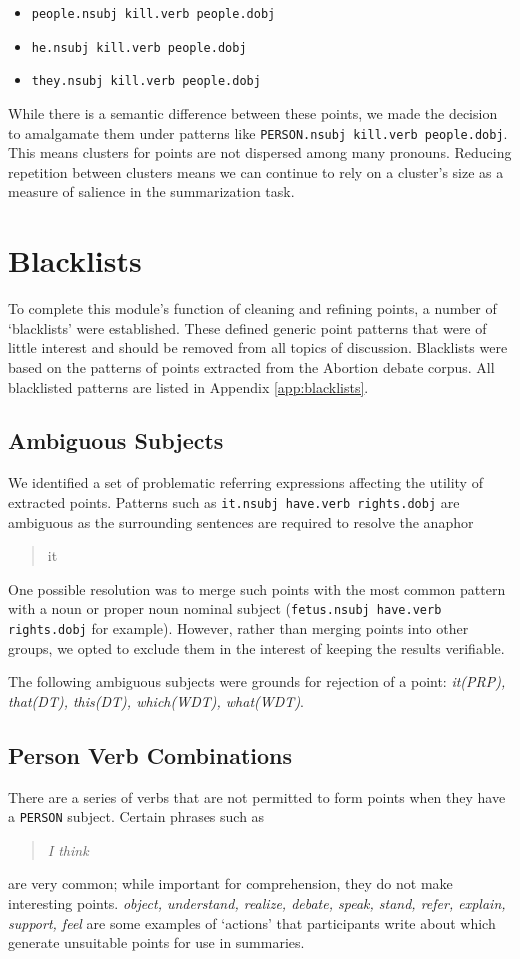     \begin{itemize}
      \item{\texttt{people.nsubj kill.verb people.dobj}}
      \item{\texttt{he.nsubj kill.verb people.dobj}}
      \item{\texttt{they.nsubj kill.verb people.dobj}}
    \end{itemize}

    While there is a semantic difference between these points, we made the decision to amalgamate them under patterns like \texttt{PERSON.nsubj kill.verb people.dobj}. This means clusters for points are not dispersed among many pronouns. Reducing repetition between clusters means we can continue to rely on a cluster's size as a measure of salience in the summarization task.

  \section{Blacklists}
    To complete this module's function of cleaning and refining points, a number of `blacklists' were established. These defined generic point patterns that were of little interest and should be removed from all topics of discussion. Blacklists were based on the patterns of points extracted from the Abortion debate corpus. All blacklisted patterns are listed in Appendix \ref{app:blacklists}.

    \tocless\subsection{Ambiguous Subjects}
      We identified a set of problematic referring expressions affecting the utility of extracted points. Patterns such as \texttt{it.nsubj have.verb rights.dobj} are ambiguous as the surrounding sentences are required to resolve the anaphor \blockquote{it}. One possible resolution was to merge such points with the most common pattern with a noun or proper noun nominal subject (\texttt{fetus.nsubj have.verb rights.dobj} for example). However, rather than merging points into other groups, we opted to exclude them in the interest of keeping the results verifiable.

      The following ambiguous subjects were grounds for rejection of a point: \textit{it(PRP), that(DT), this(DT), which(WDT), what(WDT)}.

    \tocless\subsection{Person Verb Combinations}
    There are a series of verbs that are not permitted to form points when they have a \texttt{PERSON} subject. Certain phrases such as \blockquote{\textit{I think}} are very common; while important for comprehension, they do not make interesting points. \textit{object, understand, realize, debate, speak, stand, refer, explain, support, feel} are some examples of `actions' that participants write about which generate unsuitable points for use in summaries.

